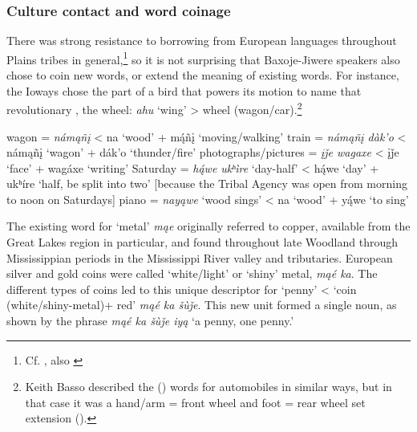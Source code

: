 \documentclass[output=paper]{LSP/langsci}
\begin{document}
\subsubsection{Culture contact and word coinage}
					   		     	     
There was strong resistance to borrowing from European languages throughout Plains tribes in general,\footnote{Cf. \citet{Brown1999}, also \citet{Larson2004}} so it is not surprising that Baxoje-Jiwere speakers also chose to coin new words, or extend the meaning of existing words. For instance, the Ioways chose the part of a bird that powers its motion to name that revolutionary , the wheel: \textit{ahu} `wing' > wheel (wagon/car).\footnote{Keith Basso described the  () words for automobiles in similar ways, but in that case it was a hand/arm = front wheel and foot = rear wheel set extension (\citeyear[17]{Basso1990}).}   

\begin{exe}
\ex
\begin{xlist}
\ex wagon = \textit{nám\k{a}ñ\k{i}} < na `wood' + m\k{á}ñ\k{i}  {\upshape `moving/walking'}
\ex train = \textit{nám\k{a}ñ\k{i} dàk'o}  <  nám\k{a}ñ\k{i} `wagon' + dák'o  {\upshape `thunder/fire'		       	          	}
\ex photographs/pictures = \textit{\k{i}\v{j}e wagaxe}  < \k{i}\v{j}e `face' + wagáxe  {\upshape `writing'	        	         	}
\ex Saturday = \textit{h\k{á}we ukʰ\`ire} `day-half' < h\k{á}we `day' + ukʰíre  {\upshape `half, be split into two' 	[because the Tribal Agency was open from morning to noon on Saturdays]        	    	}
\ex piano = \textit{nay\k{a}we}  `wood sings' < na `wood' + y\k{á}we   {\upshape `to sing'}
\end{xlist}
\end{exe}

The existing word for `metal' \textit{m\k{a}e} originally referred to copper, available from the Great Lakes region in particular, and found throughout late Woodland through Mississippian periods in the Mississippi River valley and tributaries.  European silver and gold coins were called `white/light' or `shiny' metal, \textit{m\k{a}é ka}. The different types of coins led to this unique descriptor for `penny' < `coin (white/shiny-metal)+ red' \textit{m\k{a}é ka \v{s}\`u\v{j}e}.  This new unit formed a single  noun, as shown by the phrase \textit{m\k{a}é ka \v{s}\`u\v{j}e iy\k{a}} `a penny, one penny.'
\end{document}
